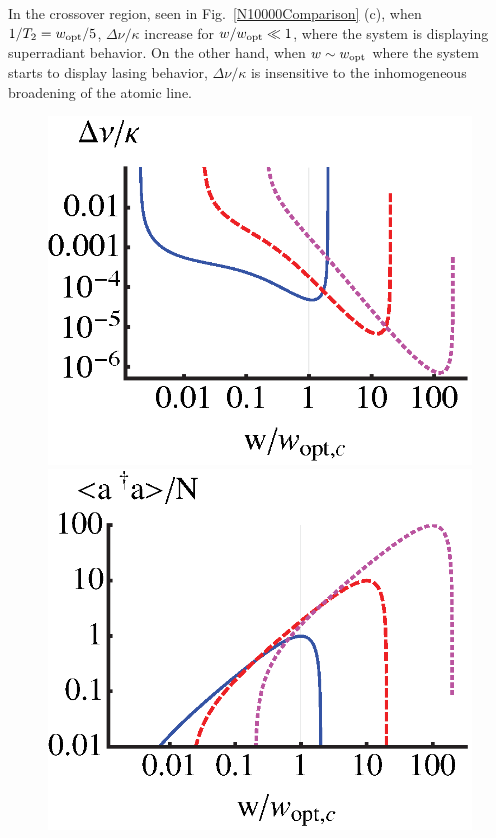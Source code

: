 \documentclass[aps,
twocolumn,
showpacs,
superscriptaddress,groupedaddress]{revtex4}
\begin{document}
In the crossover region, seen in Fig.~\ref{N10000Comparison} (c), when
$1/T_2=w_{\rm opt}/5$, $\Delta \nu/\kappa$ increase for $w/w_{\rm opt}\ll 1$,
where the system is displaying superradiant behavior.  On the other
hand, when $w \sim w_{\rm opt}$ where the
system starts to display lasing behavior, $\Delta\nu/\kappa$ is
insensitive to the inhomogeneous broadening of the atomic line.
\begin{figure}
\begin{center}
	\includegraphics[scale =0.415] {LinewidthComparisonLangevin.eps}
	\hspace{-4mm} \includegraphics[scale =0.415] {adaComparisonLangevin.eps}\\

\end{center}
\end{figure}
\end{document}
